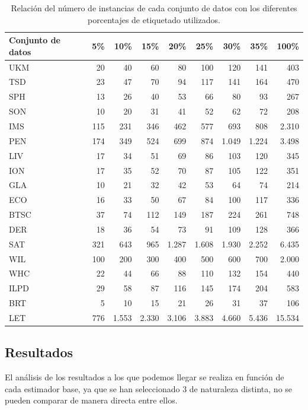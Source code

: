 \begin{table}[]
    \centering
    \tiny
    \begin{tabular}{lrrrrrrr|r}
    \toprule
        \textbf{Conjunto de datos} & \textbf{5\%} & \textbf{10\%} & \textbf{15\%} & \textbf{20\%} & \textbf{25\%} & \textbf{30\%} &\textbf{ 35\%} & \textbf{100\%} \\ 
    \toprule
        UKM & 20 & 40 & 60 & 80 & 100 & 120 & 141 & 403 \\ 
        TSD & 23 & 47 & 70 & 94 & 117 & 141 & 164 & 470 \\ 
        SPH & 13 & 26 & 40 & 53 & 66 & 80 & 93 & 267 \\
        SON & 10 & 20 & 31 & 41 & 52 & 62 & 72 & 208 \\ 
        IMS & 115 & 231 & 346 & 462 & 577 & 693 & 808 & 2.310 \\ 
        PEN & 174 & 349 & 524 & 699 & 874 & 1.049 & 1.224 & 3.498 \\ 
        LIV & 17 & 34 & 51 & 69 & 86 & 103 & 120 & 345 \\ 
        ION & 17 & 35 & 52 & 70 & 87 & 105 & 122 & 351 \\ 
        GLA & 10 & 21 & 32 & 42 & 53 & 64 & 74 & 214 \\
        ECO & 16 & 33 & 50 & 67 & 84 & 100 & 117 & 336 \\
        BTSC & 37 & 74 & 112 & 149 & 187 & 224 & 261 & 748 \\ 
        DER & 18 & 36 & 54 & 73 & 91 & 109 & 128 & 366 \\
        SAT & 321 & 643 & 965 & 1.287 & 1.608 & 1.930 & 2.252 & 6.435 \\ 
        WIL & 100 & 200 & 300 & 400 & 500 & 600 & 700 & 2.000 \\ 
        WHC & 22 & 44 & 66 & 88 & 110 & 132 & 154 & 440 \\ 
        ILPD & 29 & 58 & 87 & 116 & 145 & 174 & 204 & 583 \\ 
        BRT & 5 & 10 & 15 & 21 & 26 & 31 & 37 & 106 \\ 
        LET & 776 & 1.553 & 2.330 & 3.106 & 3.883 & 4.660 & 5.436 & 15.534 \\ 
        \bottomrule
    \end{tabular}
    \caption{Relación del número de instancias de cada conjunto de datos con los diferentes porcentajes de etiquetado utilizados.}\label{tab:exp:percents}
\end{table}

\FloatBarrier
\subsection{Resultados}
El análisis de los resultados a los que podemos llegar se realiza en función de cada estimador base, ya que se han seleccionado 3 de naturaleza distinta, no se pueden comparar de manera directa entre ellos.


